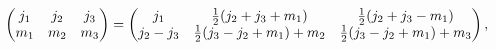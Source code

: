 \[\begin{pmatrix}j_{1}&j_{2}&j_{3}\\
m_{1}&m_{2}&m_{3}\end{pmatrix}=\begin{pmatrix}j_{1}&\frac{1}{2}(j_{2}+j_{3}+m_%
{1})&\frac{1}{2}(j_{2}+j_{3}-m_{1})\\
j_{2}-j_{3}&\frac{1}{2}(j_{3}-j_{2}+m_{1})+m_{2}&\frac{1}{2}(j_{3}-j_{2}+m_{1}%
)+m_{3}\end{pmatrix},\]